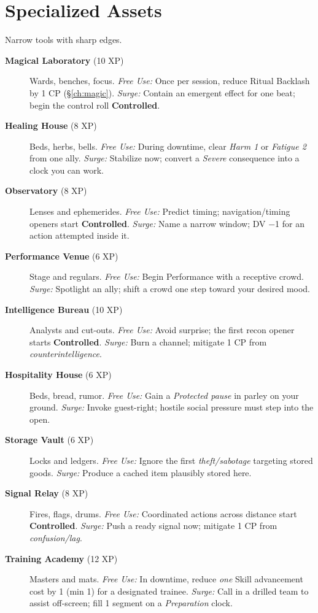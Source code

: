 \section{Specialized Assets}
Narrow tools with sharp edges.
\begin{description}
  \item[\textbf{Magical Laboratory} (10 XP)]  Wards, benches, focus. \emph{Free Use:} Once per session, reduce Ritual Backlash by 1 CP (\S\ref{ch:magic}). \emph{Surge:} Contain an emergent effect for one beat; begin the control roll \textbf{Controlled}.
  \item[\textbf{Healing House} (8 XP)]  Beds, herbs, bells. \emph{Free Use:} During downtime, clear \emph{Harm 1} or \emph{Fatigue 2} from one ally. \emph{Surge:} Stabilize now; convert a \emph{Severe} consequence into a clock you can work.
  \item[\textbf{Observatory} (8 XP)]  Lenses and ephemerides. \emph{Free Use:} Predict timing; navigation/timing openers start \textbf{Controlled}. \emph{Surge:} Name a narrow window; DV −1 for an action attempted inside it.
  \item[\textbf{Performance Venue} (6 XP)]  Stage and regulars. \emph{Free Use:} Begin Performance with a receptive crowd. \emph{Surge:} Spotlight an ally; shift a crowd one step toward your desired mood.
  \item[\textbf{Intelligence Bureau} (10 XP)]  Analysts and cut-outs. \emph{Free Use:} Avoid surprise; the first recon opener starts \textbf{Controlled}. \emph{Surge:} Burn a channel; mitigate 1 CP from \emph{counterintelligence}.
  \item[\textbf{Hospitality House} (6 XP)]  Beds, bread, rumor. \emph{Free Use:} Gain a \emph{Protected pause} in parley on your ground. \emph{Surge:} Invoke guest-right; hostile social pressure must step into the open.
  \item[\textbf{Storage Vault} (6 XP)]  Locks and ledgers. \emph{Free Use:} Ignore the first \emph{theft/sabotage} targeting stored goods. \emph{Surge:} Produce a cached item plausibly stored here.
  \item[\textbf{Signal Relay} (8 XP)]  Fires, flags, drums. \emph{Free Use:} Coordinated actions across distance start \textbf{Controlled}. \emph{Surge:} Push a ready signal now; mitigate 1 CP from \emph{confusion/lag}.
  \item[\textbf{Training Academy} (12 XP)]  Masters and mats. \emph{Free Use:} In downtime, reduce \emph{one} Skill advancement cost by 1 (min 1) for a designated trainee. \emph{Surge:} Call in a drilled team to assist off-screen; fill 1 segment on a \emph{Preparation} clock.
\end{description}

